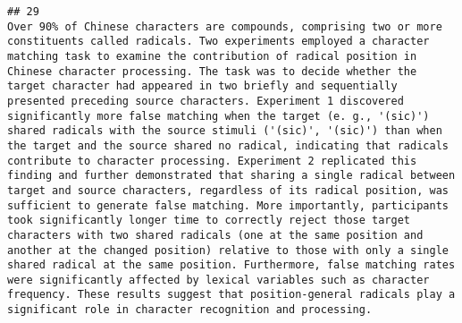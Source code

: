 \documentclass[
  english,
  man]{apa6}
\begin{document}
\begin{verbatim}
## 29                                                                                                                                                                                                                                                                                                                                                                                                                                                                                                                                                                                                                                                                                                                                                                                                                                                                                                                                                                                                                                                                                                                                                                                                                                                                               Over 90% of Chinese characters are compounds, comprising two or more constituents called radicals. Two experiments employed a character matching task to examine the contribution of radical position in Chinese character processing. The task was to decide whether the target character had appeared in two briefly and sequentially presented preceding source characters. Experiment 1 discovered significantly more false matching when the target (e. g., '(sic)') shared radicals with the source stimuli ('(sic)', '(sic)') than when the target and the source shared no radical, indicating that radicals contribute to character processing. Experiment 2 replicated this finding and further demonstrated that sharing a single radical between target and source characters, regardless of its radical position, was sufficient to generate false matching. More importantly, participants took significantly longer time to correctly reject those target characters with two shared radicals (one at the same position and another at the changed position) relative to those with only a single shared radical at the same position. Furthermore, false matching rates were significantly affected by lexical variables such as character frequency. These results suggest that position-general radicals play a significant role in character recognition and processing.

\end{verbatim}
\end{document}
